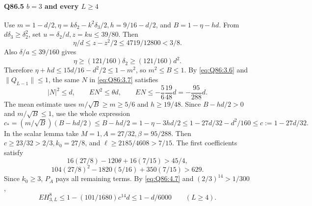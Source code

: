 \paragraph{Q86.5 \(b=\allowbreak 3\) and every \(L\ge\allowbreak 4\)}
Use \(m=\allowbreak 1-d/2,\allowbreak \eta=\allowbreak k\delta_2-k^2\delta_3/2,\allowbreak h=\allowbreak 9/16-d/2\), and
\(B=\allowbreak 1-\eta-hd\).
From \(d\delta_3\ge\allowbreak \delta_2^2\), set
\(u=\allowbreak \delta_2/d,\allowbreak z=\allowbreak ku\le\allowbreak 39/80\). Then
\[
\eta/d\le z-z^2/2\le4719/12800<3/8.
\]
Also \(\delta/a\le\allowbreak 39/160\) gives
\[
\eta\ge(121/160)\delta_2\ge(121/160)d^2.
\tag{Q86.5.1}\label{eq:Q86:5.1}
\]
Therefore \(\eta+hd\le\allowbreak 15d/16-d^2/2\le\allowbreak 1-m^2\), so \(m^2\le\allowbreak  B\le\allowbreak 1\).
By \eqref{eq:Q86:3.6} and \(\|Q_{L-1}\|\le\allowbreak 1\), the same \(N\) in
\eqref{eq:Q86:3.7} satisfies
\[
|N|^2\le d,\qquad EN^2\le\theta d,\qquad
EN\le-\frac56\frac{19}{48}d=-\frac{95}{288}d.
\tag{Q86.5.2}\label{eq:Q86:5.2}
\]
The mean estimate uses \(m/\sqrt B\ge\allowbreak  m\ge\allowbreak 5/6\) and \(h\ge\allowbreak 19/48\).
Since \(B-hd/2>\allowbreak 0\) and \(m/\sqrt B\le\allowbreak 1\), use the whole expression
\[
c_*=(m/\sqrt B)(B-hd/2)
\le B-hd/2=1-\eta-3hd/2
\le1-27d/32-d^2/160\le c:=1-27d/32.
\tag{Q86.5.3}\label{eq:Q86:5.3}
\]
In the scalar lemma take \(M=\allowbreak 1,\allowbreak A=\allowbreak 27/32,\allowbreak \beta=\allowbreak 95/288\).
Then \(c\ge\allowbreak 23/32>\allowbreak 2/3,\allowbreak k_0=\allowbreak 27/8\), and
\(\ell\ge\allowbreak 2185/4608>\allowbreak 7/15\).
The first coefficients satisfy
\[
16(27/8)-120\theta+16(7/15)>45/4,
\]
\[
104(27/8)^2-1820(5/16)+350(7/15)>629.
\]
Since \(k_0\ge\allowbreak 3\), \(P_A\) pays all remaining terms.
By \eqref{eq:Q86:4.7} and \((2/3)^{14}>\allowbreak 1/300\),
\[
E H_{3,L}^8\le1-(101/1680)c^{14}d\le1-d/6000
\qquad(L\ge4).
\tag{Q86.5.4}\label{eq:Q86:5.4}
\]

